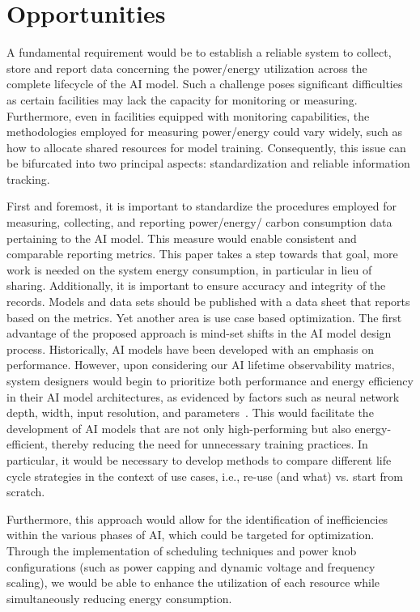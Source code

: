 \section{Opportunities}
{
    \label{opportunities}

    A fundamental requirement would be to establish a reliable system to collect, store and report data concerning the power/energy utilization across the complete lifecycle of the AI model. Such a challenge poses significant difficulties as certain facilities may lack the capacity for monitoring or measuring. Furthermore, even in facilities equipped with monitoring capabilities, the methodologies employed for measuring power/energy could vary widely, such as how to allocate shared resources for model training. Consequently, this issue can be bifurcated into two principal aspects: standardization and reliable information tracking.

    First and foremost, it is important to standardize the procedures employed for measuring, collecting, and reporting {power/energy/} carbon consumption data pertaining to the AI model. This measure would enable consistent and comparable reporting metrics. This paper takes a step towards that goal, more work is needed on the system energy consumption, in particular in lieu of sharing. Additionally, it is important to ensure accuracy and integrity of the records.
Models and data sets should be published with a data sheet that reports based on the metrics. Yet another area is use case based optimization. The first advantage of the proposed approach is mind-set shifts in the AI model design process. Historically, AI models have been developed with an emphasis on performance. However, upon considering our AI lifetime observability matrics, system designers would begin to prioritize both performance and energy efficiency in their AI model architectures, as evidenced by factors such as neural network depth, width, input resolution, and parameters~\cite{Desislavov2023}. This would facilitate the development of AI models that are not only high-performing but also energy-efficient, thereby reducing the need for unnecessary training practices. In particular, it would be necessary to develop methods to compare different life cycle strategies in the context of use cases, i.e., re-use (and what) vs. start from scratch.

    Furthermore, this approach would allow for the identification of inefficiencies within the various phases of AI, which could be targeted for optimization. Through the implementation of scheduling techniques and power knob configurations (such as power capping and dynamic voltage and frequency scaling), we would be able to enhance the utilization of each resource while simultaneously reducing energy consumption.
}
